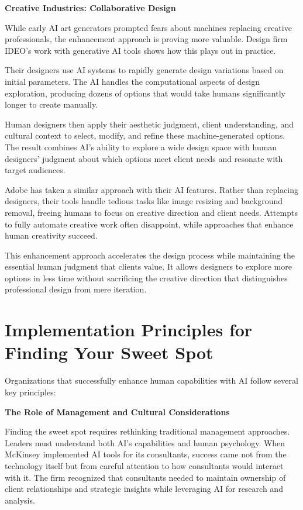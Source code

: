 \documentclass[
  Letterpaper,
]{scrbook}
\begin{document}
\textbf{Creative Industries: Collaborative Design}

While early AI art generators prompted fears about machines replacing
creative professionals, the enhancement approach is proving more
valuable. Design firm IDEO's work with generative AI tools shows how
this plays out in practice.

Their designers use AI systems to rapidly generate design variations
based on initial parameters. The AI handles the computational aspects of
design exploration, producing dozens of options that would take humans
significantly longer to create manually.

Human designers then apply their aesthetic judgment, client
understanding, and cultural context to select, modify, and refine these
machine-generated options. The result combines AI's ability to explore a
wide design space with human designers' judgment about which options
meet client needs and resonate with target audiences.

Adobe has taken a similar approach with their AI features. Rather than
replacing designers, their tools handle tedious tasks like image
resizing and background removal, freeing humans to focus on creative
direction and client needs. Attempts to fully automate creative work
often disappoint, while approaches that enhance human creativity
succeed.

This enhancement approach accelerates the design process while
maintaining the essential human judgment that clients value. It allows
designers to explore more options in less time without sacrificing the
creative direction that distinguishes professional design from mere
iteration.

\section{Implementation Principles for Finding Your Sweet
Spot}\label{implementation-principles-for-finding-your-sweet-spot}

Organizations that successfully enhance human capabilities with AI
follow several key principles:

\textbf{The Role of Management and Cultural Considerations}

Finding the sweet spot requires rethinking traditional management
approaches. Leaders must understand both AI's capabilities and human
psychology. When McKinsey implemented AI tools for its consultants,
success came not from the technology itself but from careful attention
to how consultants would interact with it. The firm recognized that
consultants needed to maintain ownership of client relationships and
strategic insights while leveraging AI for research and analysis.
\end{document}
